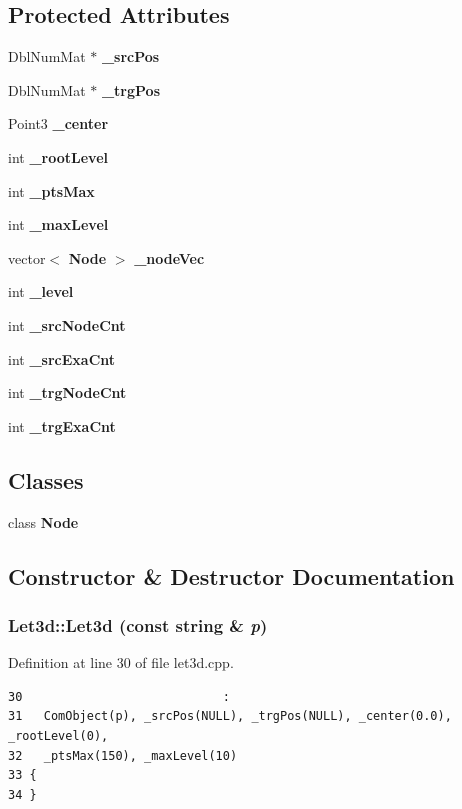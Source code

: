 \subsection*{Protected Attributes}
\begin{CompactItemize}
\item 
Dbl\-Num\-Mat $\ast$ {\bf \_\-src\-Pos}
\item 
Dbl\-Num\-Mat $\ast$ {\bf \_\-trg\-Pos}
\item 
Point3 {\bf \_\-center}
\item 
int {\bf \_\-root\-Level}
\item 
int {\bf \_\-pts\-Max}
\item 
int {\bf \_\-max\-Level}
\item 
vector$<$ {\bf Node} $>$ {\bf \_\-node\-Vec}
\item 
int {\bf \_\-level}
\item 
int {\bf \_\-src\-Node\-Cnt}
\item 
int {\bf \_\-src\-Exa\-Cnt}
\item 
int {\bf \_\-trg\-Node\-Cnt}
\item 
int {\bf \_\-trg\-Exa\-Cnt}
\end{CompactItemize}
\subsection*{Classes}
\begin{CompactItemize}
\item 
class {\bf Node}
\end{CompactItemize}


\subsection{Constructor \& Destructor Documentation}
\subsubsection{\setlength{\rightskip}{0pt plus 5cm}Let3d::Let3d (const string \& {\em p})}\label{classLet3d_f8d536a83eec83f76c37ef8ab65ca50a_f8d536a83eec83f76c37ef8ab65ca50a}




Definition at line 30 of file let3d.cpp.

\footnotesize\begin{verbatim}30                            :
31   ComObject(p), _srcPos(NULL), _trgPos(NULL), _center(0.0), _rootLevel(0),
32   _ptsMax(150), _maxLevel(10)
33 {
34 }

\end{verbatim}\normalsize 


